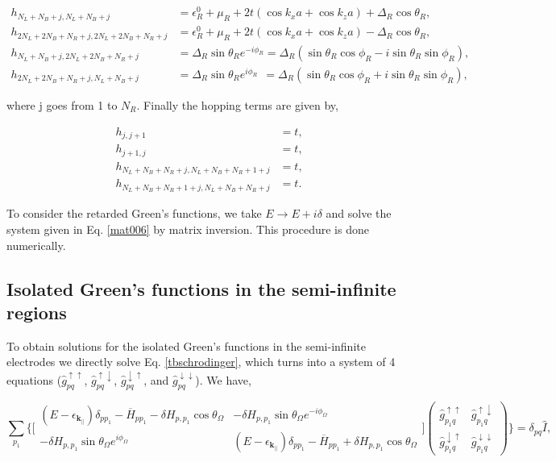 \documentclass[10pt,prb,showpacs,amssymb,floatfix]{revtex4-1}
\newcommand{\dna}{\downarrow}
\newcommand{\upa}{\uparrow}
\newcommand{\dlt}{\delta}
\newcommand{\Dlt}{\Delta}
\newcommand{\eps}{\epsilon}
\newcommand{\Og}{\Omega}
\newcommand{\h}{\hat}
\begin{document}
\begin{align}
h_{N_L+N_B+j, N_L + N_B + j}&= \eps^0_R + \mu_R + 2t(\cos k_x a + \cos k_z a) + \Dlt_R \cos\theta_R, \\
h_{2N_L+2N_B+N_R+j,2N_L+2N_B+N_R+j} &= \eps^0_R + \mu_R + 2t(\cos k_x a + \cos k_z a) - \Dlt_R \cos\theta_R, \\
h_{N_L + N_B + j, 2N_L+2N_B+N_R+j} &= \Dlt_R \sin\theta_R e^{-i\phi_R } = \Dlt_R  (\sin\theta_R\cos\phi_R - i\sin\theta_R\sin\phi_R), \\
h_{2N_L+2N_B+N_R+j, N_L+N_B+j} &= \Dlt_R \sin\theta_R e^{i\phi_R }~~ = \Dlt_R  (\sin\theta_R\cos\phi_R + i\sin\theta_R\sin\phi_R), 
\end{align}

where j goes from 1 to $N_R$. Finally the hopping terms are given by,

\begin{align}
h_{j,j+1} &= t, \\
h_{j+1, j} &= t, \\
h_{N_L+N_B+N_R+j, N_L+N_B+N_R+1+j} &= t, \\
h_{N_L+N_B+N_R+1+j, N_L+N_B+N_R + j} &= t.
\end{align}


To consider the retarded Green's functions, we take $E \rightarrow E + i\dlt$ and solve the system given in Eq. \eqref{mat006} by matrix inversion. This procedure is done numerically.

\subsection{Isolated Green's functions in the semi-infinite regions}


To obtain solutions for the isolated Green's functions in the semi-infinite electrodes we directly solve Eq. \eqref{tbschrodinger}, which turns into a system of 4 equations ($\h g_{pq}^{\uparrow\uparrow}$, $\h g_{pq}^{\uparrow\downarrow}$, $\h g_{pq}^{\downarrow\uparrow}$, and $\h g_{pq}^{\downarrow\downarrow}$). We have,

\begin{equation}
\sum_{p_1} \Bigg \{ \bigg[\begin{array}{ccc} (E-\eps_{\bm{k}_{||}})\dlt_{pp_1} -\overline{H}_{pp_1}  -\dlt H_{p,p_1} \cos\theta_\Og & -\dlt H_{p,p_1} \sin\theta_\Og e^{-i\phi_\Og} \\
-\dlt H_{p,p_1} \sin\theta_\Og e^{i\phi_\Og} & (E-\eps_{\bm{k}_{||}})\dlt_{pp_1} -\overline{H}_{pp_1}  +\dlt H_{p,p_1} \cos\theta_\Og 
 \end{array} \bigg]   \left(\begin{array}{cc} \hat{g}^{\upa\upa}_{p_1q}  &  \hat{g}^{\upa\dna}_{p_1q} \\  \hat{g}^{\dna\upa}_{p_1q} &  \hat{g}^{\dna\dna}_{p_1q} \end{array}\right)  \Bigg \}=\dlt_{pq}\hat{I},
 \label{tbschrodinger2}
\end{equation}
\end{document}
